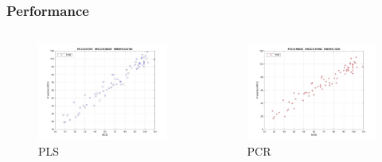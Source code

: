 \documentclass{beamer}
\begin{document}
\begin{frame}
\frametitle{Performance}
	\begin{columns}
		\centering
	\begin{column}{6cm}
		\begin{figure}
			\includegraphics[scale=0.17]{images/PLS_testResult} 
			\centering
			\caption{PLS}
		\end{figure}
	\end{column}
	\centering
	\begin{column}{6cm}
		\begin{figure}
			\includegraphics[scale=0.17]{images/PCR_testResult.jpg} 
			\centering
			\caption{PCR}
		\end{figure}
	\end{column}
\end{columns}
\end{frame} 
\end{document}
